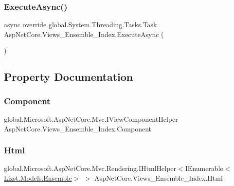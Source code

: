 \subsubsection{\texorpdfstring{ExecuteAsync()}{ExecuteAsync()}}
{\footnotesize\ttfamily async override global.\+System.\+Threading.\+Tasks.\+Task Asp\+Net\+Core.\+Views\+\_\+\+Ensemble\+\_\+\+Index.\+Execute\+Async (\begin{DoxyParamCaption}{ }\end{DoxyParamCaption})}



\subsection{Property Documentation}
\mbox{\label{class_asp_net_core_1_1_views___ensemble___index_ad36fb66b3efe7c992e76c70173f30dd8}} 
\subsubsection{\texorpdfstring{Component}{Component}}
{\footnotesize\ttfamily global.\+Microsoft.\+Asp\+Net\+Core.\+Mvc.\+I\+View\+Component\+Helper Asp\+Net\+Core.\+Views\+\_\+\+Ensemble\+\_\+\+Index.\+Component\hspace{0.3cm}{\ttfamily [get]}}

\mbox{\label{class_asp_net_core_1_1_views___ensemble___index_a5d22b9f5e9c60beebcf9198f01e684ba}} 
\subsubsection{\texorpdfstring{Html}{Html}}
{\footnotesize\ttfamily global.\+Microsoft.\+Asp\+Net\+Core.\+Mvc.\+Rendering.\+I\+Html\+Helper$<$I\+Enumerable$<$\mbox{\hyperlink{class_lizst_1_1_models_1_1_ensemble}{Lizst.\+Models.\+Ensemble}}$>$ $>$ Asp\+Net\+Core.\+Views\+\_\+\+Ensemble\+\_\+\+Index.\+Html\hspace{0.3cm}{\ttfamily [get]}}

